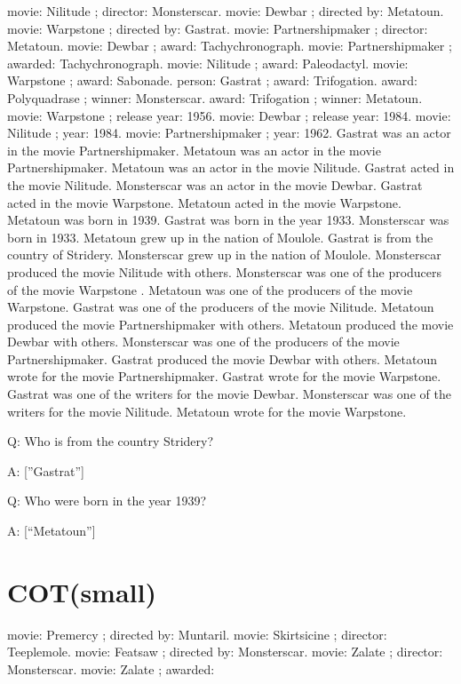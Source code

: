 \documentclass[
]{article}
\begin{document}
movie: Nilitude ; director: Monsterscar. movie: Dewbar ; directed by:
Metatoun. movie: Warpstone ; directed by: Gastrat. movie:
Partnershipmaker ; director: Metatoun. movie: Dewbar ; award:
Tachychronograph. movie: Partnershipmaker ; awarded: Tachychronograph.
movie: Nilitude ; award: Paleodactyl. movie: Warpstone ; award:
Sabonade. person: Gastrat ; award: Trifogation. award: Polyquadrase ;
winner: Monsterscar. award: Trifogation ; winner: Metatoun. movie:
Warpstone ; release year: 1956. movie: Dewbar ; release year: 1984.
movie: Nilitude ; year: 1984. movie: Partnershipmaker ; year: 1962.
Gastrat was an actor in the movie Partnershipmaker. Metatoun was an
actor in the movie Partnershipmaker. Metatoun was an actor in the movie
Nilitude. Gastrat acted in the movie Nilitude. Monsterscar was an actor
in the movie Dewbar. Gastrat acted in the movie Warpstone. Metatoun
acted in the movie Warpstone. Metatoun was born in 1939. Gastrat was
born in the year 1933. Monsterscar was born in 1933. Metatoun grew up in
the nation of Moulole. Gastrat is from the country of Stridery.
Monsterscar grew up in the nation of Moulole. Monsterscar produced the
movie Nilitude with others. Monsterscar was one of the producers of the
movie Warpstone . Metatoun was one of the producers of the movie
Warpstone. Gastrat was one of the producers of the movie Nilitude.
Metatoun produced the movie Partnershipmaker with others. Metatoun
produced the movie Dewbar with others. Monsterscar was one of the
producers of the movie Partnershipmaker. Gastrat produced the movie
Dewbar with others. Metatoun wrote for the movie Partnershipmaker.
Gastrat wrote for the movie Warpstone. Gastrat was one of the writers
for the movie Dewbar. Monsterscar was one of the writers for the movie
Nilitude. Metatoun wrote for the movie Warpstone.

Q: Who is from the country Stridery?

A: {[}''Gastrat''{]}

Q: Who were born in the year 1939?

A: {[}``Metatoun''{]}

\section{COT(small)}\label{cotsmall}

movie: Premercy ; directed by: Muntaril. movie: Skirtsicine ; director:
Teeplemole. movie: Featsaw ; directed by: Monsterscar. movie: Zalate ;
director: Monsterscar. movie: Zalate ; awarded:
\end{document}
